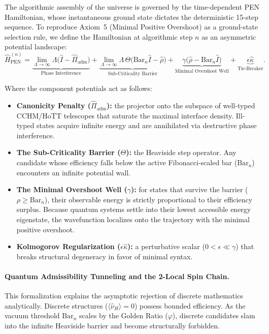 \documentclass[11pt,a4paper]{article}
\theoremstyle{plain}
\theoremstyle{definition}
\theoremstyle{remark}
\begin{document}
The algorithmic assembly of the universe is governed by the time-dependent PEN Hamiltonian, whose instantaneous ground state dictates the deterministic 15-step sequence.
To reproduce Axiom~5 (Minimal Positive Overshoot) as a ground-state selection rule, we define the Hamiltonian at algorithmic step $n$ as an asymmetric potential landscape:
\begin{equation}
\label{eq:pen-hamiltonian}
    \hat{H}_{\mathrm{PEN}}^{(n)}
    =
    \underbrace{\lim_{\Lambda \to \infty} \Lambda \big( \hat{I} - \hat{\Pi}_{\mathrm{adm}} \big)}_{\text{Phase Interference}}
    +
    \underbrace{\lim_{\Lambda \to \infty} \Lambda \, \Theta\Big( \mathrm{Bar}_n \hat{I} - \hat{\rho} \Big)}_{\text{Sub-Criticality Barrier}}
    +
    \underbrace{\gamma \Big( \hat{\rho} - \mathrm{Bar}_n \hat{I} \Big)}_{\text{Minimal Overshoot Well}}
    +
    \underbrace{\epsilon \hat{\kappa}}_{\text{Tie-Breaker}}.
\end{equation}

Where the component potentials act as follows:
\begin{itemize}[nosep]
    \item \textbf{Canonicity Penalty ($\hat{\Pi}_{\mathrm{adm}}$):} the projector onto the subspace of well-typed CCHM/HoTT telescopes that saturate the maximal interface density. Ill-typed states acquire infinite energy and are annihilated via destructive phase interference.
    \item \textbf{The Sub-Criticality Barrier ($\Theta$):} the Heaviside step operator. Any candidate whose efficiency falls below the active Fibonacci-scaled bar ($\mathrm{Bar}_n$) encounters an infinite potential wall.
    \item \textbf{The Minimal Overshoot Well ($\gamma$):} for states that survive the barrier ($\rho \ge \mathrm{Bar}_n$), their observable energy is strictly proportional to their efficiency surplus. Because quantum systems settle into their lowest accessible energy eigenstate, the wavefunction localizes onto the trajectory with the minimal positive overshoot.
    \item \textbf{Kolmogorov Regularization ($\epsilon \hat{\kappa}$):} a perturbative scalar ($0 < \epsilon \ll \gamma$) that breaks structural degeneracy in favor of minimal syntax.
\end{itemize}

\paragraph{Quantum Admissibility Tunneling and the 2-Local Spin Chain.}
This formalization explains the asymptotic rejection of discrete mathematics analytically.
Discrete structures ($\langle \hat{\nu}_H \rangle = 0$) possess bounded efficiency.
As the vacuum threshold $\mathrm{Bar}_n$ scales by the Golden Ratio ($\varphi$), discrete candidates slam into the infinite Heaviside barrier and become structurally forbidden.
\end{document}
